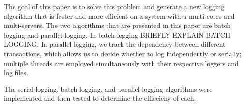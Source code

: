 The goal of this paper is to solve this problem and generate a new logging algorithm that is faster and more efficient on a system with a multi-cores and multi-servers. The two algorithms that are presented in this paper are batch logging and parallel logging. In batch logging BRIEFLY EXPLAIN BATCH LOGGING. In parallel logging, we track the dependency between different transactions, which allows us to decide whether to log  independently or serially; multiple threads are employed simultaneously with their respective loggers and log files. \newline

The serial logging, batch logging, and parallel logging algorithms were implemented and then tested to determine the effiecieny of each. 


  
